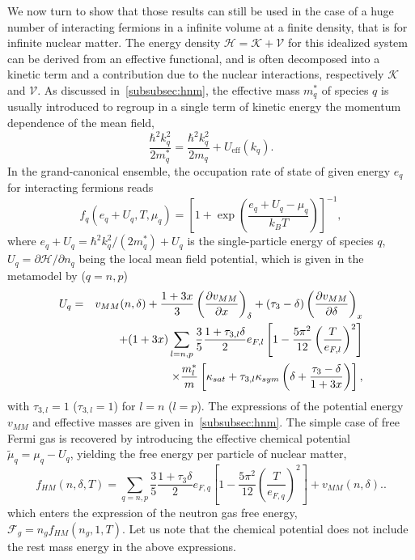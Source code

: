 We now turn to show that those results can still be used in the case of 
a huge number of interacting fermions in a infinite volume at a finite density, 
that is for infinite nuclear matter. The energy density $\mathcal{H} =
\mathcal{K} + \mathcal{V}$ for this idealized system can be derived from an
effective functional, and is often decomposed into a kinetic term and a 
contribution due to the nuclear interactions, respectively $\mathcal{K}$ and 
$\mathcal{V}$.
As discussed in~\ref{subsubsec:hnm}, the effective mass $m_q^*$ of species $q$ 
is usually introduced to regroup in a single term of kinetic energy the 
momentum dependence of the mean field,
%
\begin{equation}
  \frac{\hbar^2 k_q^2}{2m_q^*} = \frac{\hbar^2 k_q^2}{2m_q} +
  U_{\text{eff}}(k_q).
\end{equation}
%
In the grand-canonical ensemble, the occupation rate of state of given energy
$e_q$ for interacting fermions reads
%
\begin{equation}
  f_q(e_q+U_q, T, \mu_q) 
  = \left[1+\exp\left(\frac{e_q + U_q - \mu_q}{k_B T}\right)\right]^{-1},
\end{equation}
%
where $e_q + U_q = \hbar^2 k_q^2/(2m_q^*) + U_q$ is the single-particle energy
of species $q$, $U_q = \partial\mathcal{H}/\partial n_q$ being the local mean
field potential, which is given in the metamodel by ($q=n,p$)
%
\begin{eqnarray}
  U_q &=& v_{MM}(n,\delta) + \frac{1+3x}{3}\left(\frac{\partial
  v_{MM}}{\partial x}\right)_{\delta}
  + (\tau_3 - \delta) 
  \left(\frac{\partial v_{MM}}{\partial \delta}\right)_x\notag\\
      &&+ (1+3x)\sum_{l=n,p}\frac{3}{5}\frac{1+\tau_{3,l}\delta}{2}
      e_{F,l}\left[1-\frac{5\pi^2}{12}\left(\frac{T}{e_{F,l}}\right)^2\right]
      \notag\\
      &&\times \frac{m_l^*}{m} \left[
        \kappa_{sat}+\tau_{3,l} \kappa_{sym} \left(\delta
        + \frac{\tau_3-\delta}{1+3x}\right)
    \right],
\end{eqnarray}
%
with $\tau_{3,l} = 1$ ($\tau_{3,l} = 1$) for $l=n$ ($l=p$). The expressions of
the potential energy $v_{MM}$ and effective masses are given 
in~\ref{subsubsec:hnm}. The simple case of free Fermi gas is recovered by 
introducing the effective chemical potential $\tilde{\mu}_q = \mu_q - U_q$,
yielding the free energy per particle of nuclear matter,
%
\begin{equation}
  f_{HM}(n,\delta,T) = \sum_{q=n,p}
  \frac{3}{5}\frac{1+\tau_3\delta}{2}e_{F,q}\left[
  1-\frac{5\pi^2}{12}\left(\frac{T}{e_{F,q}}\right)^2\right] +
  v_{MM}(n,\delta).\label{eq:freehm}.
\end{equation}
%
which enters the expression of the neutron gas free energy, $\mathcal{F}_g =
n_g f_{HM}(n_g,1,T)$.
Let us note that the chemical potential does not include the rest mass energy 
in the above expressions.

